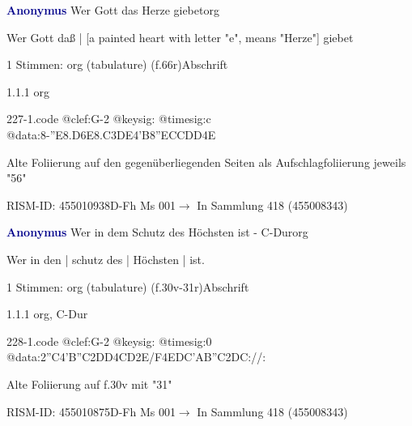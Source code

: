 \documentclass[twocolumn]{book}
\begin{document}
\par \vspace{7pt} \textcolor{darkblue}{\textbf{Anonymus  }}\hfillplus{\textbf{[227]}}\newline Wer Gott das Herze giebet\newline org
\par \begin{itshape}[f.66r, at left:] Wer Gott daß | [a painted heart with letter "e", means "Herze"] giebet\end{itshape} 
\par \textcolor{darkblue}{}  1 Stimmen: org (tabulature)  (f.66r)\newline Abschrift
\par 1.1.1  org  
\begin{filecontents*}{227-1.code}
@clef:G-2
@keysig:
@timesig:c
@data:8-{''E8.D6E}{8.C3DE}4'B{8''ECC}{DD}4E
\end{filecontents*}
\newline
%
\par Alte Foliierung auf den gegenüberliegenden Seiten als Aufschlagfoliierung jeweils "56"
\par RISM-ID: 455010938\newline D-Fh  Ms 001\newline $\rightarrow$ In Sammlung 418 (455008343)
      
\par \vspace{7pt} \textcolor{darkblue}{\textbf{Anonymus  }}\hfillplus{\textbf{[228]}}\newline Wer in dem Schutz des Höchsten ist - C-Dur\newline org
\par \begin{itshape}[f.30v, at left:] Wer in den | schutz des | Höchsten | ist.\end{itshape} 
\par \textcolor{darkblue}{}  1 Stimmen: org (tabulature)  (f.30v-31r)\newline Abschrift
\par 1.1.1  org, C-Dur  
\begin{filecontents*}{228-1.code}
@clef:G-2
@keysig:
@timesig:0
@data:2''C4'B''C2DD4CD2E/F4EDC'AB''C2DC://:
\end{filecontents*}
\newline
%
\par Alte Foliierung auf f.30v mit "31"
\par RISM-ID: 455010875\newline D-Fh  Ms 001\newline $\rightarrow$ In Sammlung 418 (455008343)
      
\end{document}
